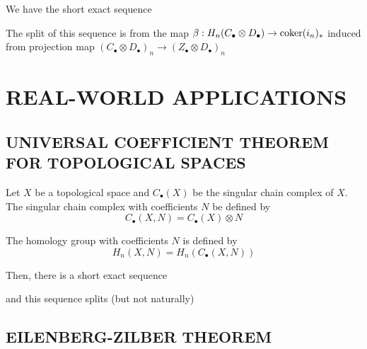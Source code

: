 \begin{longproof}
	We have the short exact sequence
	
	\begin{center}
	\end{center}
	
	The split of this sequence is from the map $\beta: H_n(C_\bullet \otimes D_\bullet) \to \operatorname{coker}(i_n)_*$ induced from projection map $(C_\bullet \otimes D_\bullet)_n \to (Z_\bullet \otimes D_\bullet)_n$
	
\end{longproof}




\section{REAL-WORLD APPLICATIONS}

\subsection{UNIVERSAL COEFFICIENT THEOREM FOR TOPOLOGICAL SPACES}

\begin{theorem}
	Let $X$ be a topological space and $C_\bullet(X)$ be the singular chain complex of $X$. The singular chain complex with coefficients $N$ be defined by
	$$
	C_\bullet(X, N) = C_\bullet(X) \otimes N
	$$
	
	The homology group with coefficients $N$ is defined by
	$$
	H_n(X, N) = H_n(C_\bullet(X, N))
	$$
	
	Then, there is a short exact sequence
	\begin{center}
	\end{center}
	
	and this sequence splits (but not naturally)
	
\end{theorem}

\subsection{EILENBERG-ZILBER THEOREM}

